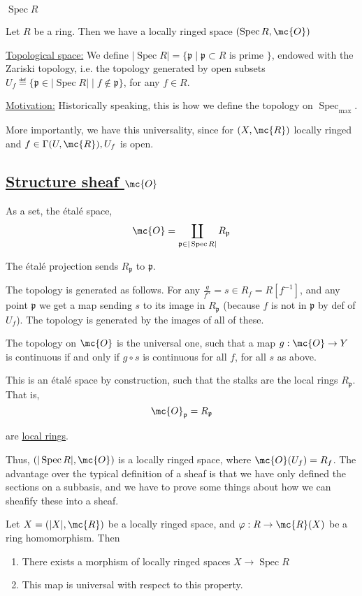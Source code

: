\documentclass[x11names,reqno,14pt]{extarticle}
\newcommand{\mk}[1]{\mathfrak{#1}}
\DeclareMathOperator{\Spec}{Spec}
\newcommand{\Specmax}{\operatorname{Spec}_{\operatorname{max}}}
\begin{document}
\underline{$\Spec R$}

Let $R$ be a ring. Then we have a locally ringed space $(\Spec R, \mc{O})$

\underline{Topological space:} We define $|\Spec R| = \{\mk{p} \mid \mk{p}\subset R\text{ is prime } \}$, endowed with the Zariski topology, i.e. the topology generated by open subsets $U_f \eqdef \{\mk{p} \in |\Spec R| \mid f \not\in \mk{p}\}$, for any $f \in R$. 

\underline{Motivation:} Historically speaking, this is how we define the topology on $\Specmax$. 

More importantly, we have this universality, since for $(X,\mc{R})$ locally ringed and $f \in \Gamma(U,\mc{R}), U_f$ is open. 

\subsection*{\underline{Structure sheaf $\mc{O}$}}

As a set, the \'etal\'e space, 
\[
\mc{O} = \coprod_{\mk{p}\in|\Spec R|} R_{\mk{p}}
\]

The \'etal\'e projection sends $R_{\mk{p}}$ to $\mk{p}$. 

The topology is generated as follows. For any $\frac{g}{f^n} = s \in R_f = R[f^{-1}]$, and any point $\mk{p}$ we get a map sending $s$ to its image in $R_{\mk{p}}$ (because $f$ is not in $\mk{p}$ by def of $U_f$). The topology is generated by the images of all of these. 

The topology on $\mc{O}$ is the universal one, such that a map $g:\mc{O}\to Y$ is continuous if and only if $g\circ s$ is continuous for all $f$, for all $s$ as above. 

This is an \'etal\'e space by construction, such that the stalks are the local rings $R_{\mk{p}}$. That is, 
\[
\mc{O}_{\mk{p}} = R_{\mk{p}}
\]

are \underline{local rings}.

Thus, $(|\Spec R|, \mc{O})$ is a locally ringed space, where $\mc{O}(U_f) = R_f$. The advantage over the typical definition of a sheaf is that we have only defined the sections on a subbasis, and we have to prove some things about how we can sheafify these into a sheaf. 

\thm Let $X = (|X|,\mc{R})$ be a locally ringed space, and $\varphi:R\to\mc{R}(X)$ be a ring homomorphism. Then 
\begin{enumerate}[label=(\alph*)]

\item There exists a morphism of locally ringed spaces $X \to \Spec R$

\item This map is universal with respect to this property. 

\end{enumerate}
\end{document}
